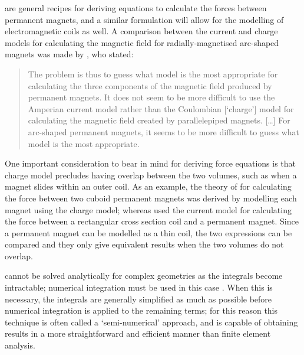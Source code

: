 \documentclass[11pt,a4paper]{memoir}
\begin{document}
 are general recipes for deriving equations to calculate the forces between permanent magnets, and a similar formulation will allow for the modelling of electromagnetic coils as well.
A comparison between the current and charge models for calculating the magnetic field for radially-magnetised arc-shaped magnets was made by \textcite{ravaud2009-pier-compare}, who stated:
\begin{quote}
The problem is thus to guess what model is the most appropriate for calculating the three components of the magnetic field produced by permanent magnets.
It does not seem to be more difficult to use the Amperian current model rather than the Coulombian [`charge'] model for calculating the magnetic field created by parallelepiped magnets. [\dots] For arc-shaped permanent magnets, it seems to be more difficult to guess what model is the most appropriate.
\end{quote}
One important consideration to bear in mind for deriving force equations is that charge model precludes having overlap between the two volumes, such as when a magnet slides within an outer coil.
As an example, the theory of \textcite{akoun1984} for calculating the force between two cuboid permanent magnets was derived by modelling each magnet using the charge model; whereas \textcite{rovers2010-ietm} used the current model for calculating the force between a rectangular cross section coil and a permanent magnet.
Since a permanent magnet can be modelled as a thin coil, the two expressions can be compared and they only give equivalent results when the two volumes do not overlap.

 cannot be solved analytically for complex geometries as the integrals become intractable; numerical integration must be used in this case \cite{charpentier2001-compel}.
When this is necessary, the integrals are generally simplified as much as possible before numerical integration is applied to the remaining terms; for this reason this technique is often called a `semi-numerical' approach, and is capable of obtaining results in a more straightforward and efficient manner than finite element analysis.
\end{document}
